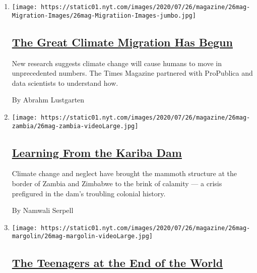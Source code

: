 \begin{enumerate}
\def\labelenumi{\arabic{enumi}.}
\item
  \texttt{[image: https://static01.nyt.com/images/2020/07/26/magazine/26mag-Migration-Images/26mag-Migratiion-Images-jumbo.jpg]}

  \hypertarget{the-great-climate-migration-has-begun}{%
  \subsection{\texorpdfstring{\href{/interactive/2020/07/23/magazine/climate-migration.html}{The
  Great Climate Migration Has
  Begun}}{The Great Climate Migration Has Begun}}\label{the-great-climate-migration-has-begun}}

  New research suggests climate change will cause humans to move in
  unprecedented numbers. The Times Magazine partnered with ProPublica
  and data scientists to understand how.

  By Abrahm Lustgarten
\item
  \texttt{[image: https://static01.nyt.com/images/2020/07/26/magazine/26mag-zambia/26mag-zambia-videoLarge.jpg]}

  \hypertarget{learning-from-the-kariba-dam}{%
  \subsection{\texorpdfstring{\href{/interactive/2020/07/22/magazine/zambia-kariba-dam.html}{Learning
  From the Kariba
  Dam}}{Learning From the Kariba Dam}}\label{learning-from-the-kariba-dam}}

  Climate change and neglect have brought the mammoth structure at the
  border of Zambia and Zimbabwe to the brink of calamity --- a crisis
  prefigured in the dam's troubling colonial history.

  By Namwali Serpell
\item
  \texttt{[image: https://static01.nyt.com/images/2020/07/26/magazine/26mag-margolin/26mag-margolin-videoLarge.jpg]}

  \hypertarget{the-teenagers-at-the-end-of-the-world}{%
  \subsection{\texorpdfstring{\href{/interactive/2020/07/21/magazine/teenage-activist-climate-change.html}{The
  Teenagers at the End of the
  World}}{The Teenagers at the End of the World}}\label{the-teenagers-at-the-end-of-the-world}}


\end{enumerate}

